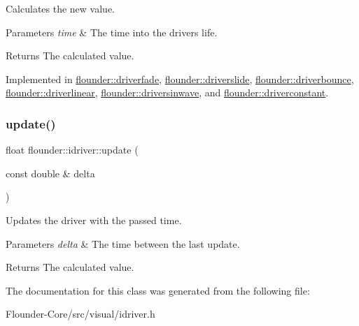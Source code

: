 Calculates the new value. 


\begin{DoxyParams}{Parameters}
{\em time} & The time into the drivers life. \\
\hline
\end{DoxyParams}
\begin{DoxyReturn}{Returns}
The calculated value. 
\end{DoxyReturn}


Implemented in \hyperlink{classflounder_1_1driverfade_af0720c2a60e768dfa9702a43969bf65d}{flounder\+::driverfade}, \hyperlink{classflounder_1_1driverslide_aecbe9478f7ea9b1a781413f9284643c6}{flounder\+::driverslide}, \hyperlink{classflounder_1_1driverbounce_a2781832b47206849a0028ee75a4772e4}{flounder\+::driverbounce}, \hyperlink{classflounder_1_1driverlinear_a7f645c05d7a8bdb555bbf70aca7c630e}{flounder\+::driverlinear}, \hyperlink{classflounder_1_1driversinwave_ae5c3d8d4bd38082ad2b0396029d45e66}{flounder\+::driversinwave}, and \hyperlink{classflounder_1_1driverconstant_acf786b61ab46ea1ebf8d9a802c33c441}{flounder\+::driverconstant}.

\mbox{\label{classflounder_1_1idriver_a1131c4e506fa5bfe3fae51b6636a09a9}} 
\subsubsection{\texorpdfstring{update()}{update()}}
{\footnotesize\ttfamily float flounder\+::idriver\+::update (\begin{DoxyParamCaption}\item[{const double \&}]{delta }\end{DoxyParamCaption})\hspace{0.3cm}{\ttfamily [inline]}}



Updates the driver with the passed time. 


\begin{DoxyParams}{Parameters}
{\em delta} & The time between the last update. \\
\hline
\end{DoxyParams}
\begin{DoxyReturn}{Returns}
The calculated value. 
\end{DoxyReturn}


The documentation for this class was generated from the following file\+:\begin{DoxyCompactItemize}
\item 
Flounder-\/\+Core/src/visual/idriver.\+h\end{DoxyCompactItemize}
